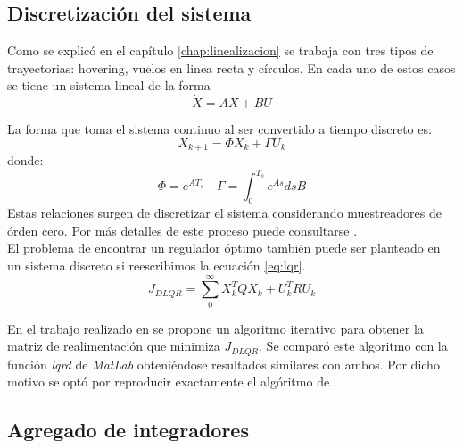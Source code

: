 \documentclass[main]{subfiles}
\begin{document}
\subsection{Discretizaci\'on del sistema}

Como se explic\'o en el cap\'itulo \ref{chap:linealizacion} se trabaja con tres tipos de trayectorias: hovering, vuelos en linea recta y c\'irculos. En cada uno de estos casos se tiene un sistema lineal de la forma 
\begin{equation}
\dot{X} = A X + BU
\end{equation}
 
La forma que toma el sistema continuo al ser convertido a tiempo discreto es: 
\begin{equation}
X_{k+1} = \Phi X_k + \Gamma U_k
\end{equation}
donde:
\begin{equation}
\Phi = e^{AT_s} \quad \Gamma = \int_0^{T_s} e^{A s} ds B
\end{equation}
Estas relaciones surgen de discretizar el sistema considerando muestreadores de \'orden cero. Por m\'as detalles de este proceso puede consultarse \cite{bib:hakas}.\\

El problema de encontrar un regulador \'optimo tambi\'en puede ser planteado en un sistema discreto si reescribimos la ecuaci\'on \ref{eq:lqr}. 
\begin{equation}
\label{eq:dlqr}
J_{DLQR} = \sum_0^\infty X_k^T Q X_k + U_k^T R U_k
\end{equation}

En el trabajo realizado en \cite{bib:lqr-discreto} se propone un algoritmo iterativo para obtener la matriz de realimentaci\'on que minimiza $J_{DLQR}$. Se compar\'o este algoritmo con la funci\'on \emph{lqrd} de \emph{MatLab} obteni\'endose resultados similares con ambos. Por dicho motivo se opt\'o por reproducir exactamente el alg\'oritmo de \cite{bib:lqr-discreto}.

\subsection{Agregado de integradores}
\end{document}
